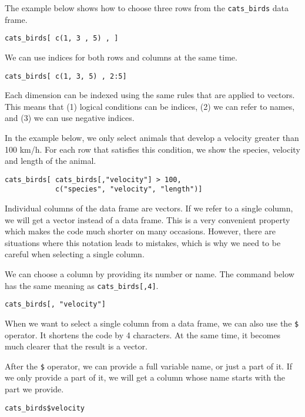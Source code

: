 \documentclass[]{book}
\theoremstyle{definition}
\theoremstyle{definition}
\theoremstyle{definition}
\theoremstyle{remark}
\begin{document}
The example below shows how to choose three rows from the
\texttt{cats\_birds} data frame.

\begin{verbatim}
cats_birds[ c(1, 3 , 5) , ]
\end{verbatim}

We can use indices for both rows and columns at the same time.

\begin{verbatim}
cats_birds[ c(1, 3, 5) , 2:5]
\end{verbatim}

Each dimension can be indexed using the same rules that are applied to
vectors. This means that (1) logical conditions can be indices, (2) we
can refer to names, and (3) we can use negative indices.

In the example below, we only select animals that develop a velocity
greater than 100 km/h. For each row that satisfies this condition, we
show the species, velocity and length of the animal.

\begin{verbatim}
cats_birds[ cats_birds[,"velocity"] > 100,
            c("species", "velocity", "length")]
\end{verbatim}

Individual columns of the data frame are vectors. If we refer to a
single column, we will get a vector instead of a data frame. This is a
very convenient property which makes the code much shorter on many
occasions. However, there are situations where this notation leads to
mistakes, which is why we need to be careful when selecting a single
column.

We can choose a column by providing its number or name. The command
below has the same meaning as \texttt{cats\_birds{[},4{]}}.

\begin{verbatim}
cats_birds[, "velocity"]
\end{verbatim}

When we want to select a single column from a data frame, we can also
use the \texttt{\$} operator. It shortens the code by 4 characters. At
the same time, it becomes much clearer that the result is a vector.

After the \texttt{\$} operator, we can provide a full variable name, or
just a part of it. If we only provide a part of it, we will get a column
whose name starts with the part we provide.

\begin{verbatim}
cats_birds$velocity
\end{verbatim}
\end{document}
